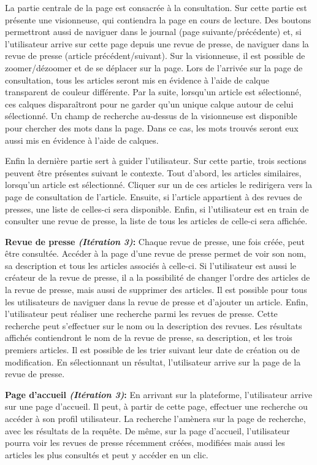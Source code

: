 	La partie centrale de la page est consacrée à la consultation. Sur cette partie est présente une visionneuse, qui contiendra la page en cours de lecture. Des boutons permettront aussi de naviguer dans le journal (page suivante/précédente) et, si l'utilisateur arrive sur cette page depuis une revue de presse, de naviguer dans la revue de presse (article précédent/suivant). Sur la visionneuse, il est possible de zoomer/dézoomer et de se déplacer sur la page. Lors de l'arrivée sur la page de consultation, tous les articles seront mis en évidence à  l'aide de calque transparent de couleur différente. Par la suite, lorsqu'un article est sélectionné, ces calques disparaîtront pour ne garder qu'un unique calque autour de celui sélectionné. Un champ de recherche au-dessus de la visionneuse est disponible pour chercher des mots dans la page. Dans ce cas, les mots trouvés seront eux aussi mis en évidence à l'aide de calques. 
	
	Enfin la dernière partie sert à guider l'utilisateur. Sur cette partie, trois sections peuvent être présentes suivant le contexte. Tout d'abord, les articles similaires, lorsqu'un article est sélectionné. Cliquer sur un de ces articles le redirigera vers la page de consultation de l'article. Ensuite, si l'article appartient à des revues de presses, une liste de celles-ci sera disponible. Enfin, si l'utilisateur est en train de consulter une revue de presse, la liste de tous les articles de celle-ci sera affichée.


	\textbf{Revue de presse \textit{(Itération 3)}:} Chaque revue de presse, une fois créée, peut être consultée. Accéder à la page d'une revue de presse permet de voir son nom, sa description et tous les articles associés à celle-ci. Si l'utilisateur est aussi le créateur de la revue de presse, il a la possibilité de changer l'ordre des articles de la revue de presse, mais aussi de supprimer des articles. Il est possible pour tous les utilisateurs de naviguer dans la revue de presse et d'ajouter un article. Enfin, l'utilisateur peut réaliser une recherche parmi les revues de presse. Cette recherche peut s'effectuer sur le nom ou la description des revues. Les résultats affichés contiendront le nom de la revue de presse, sa description, et les trois premiers articles. Il est possible de les trier suivant leur date de création ou de modification. En sélectionnant un résultat, l'utilisateur arrive sur la page de la revue de presse.

	\textbf{Page d'accueil \textit{(Itération 3)}:} En arrivant sur la plateforme, l'utilisateur arrive sur une page d'accueil. Il peut, à partir de cette page, effectuer une recherche ou accéder à son profil utilisateur. La recherche l'amènera sur la page de recherche, avec les résultats de la requête. De même, sur la page d'accueil, l'utilisateur pourra voir les revues de presse récemment créées, modifiées mais aussi les articles les plus consultés et peut y accéder en un clic.

